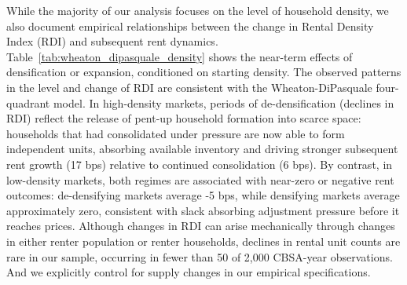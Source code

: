 \documentclass[pdflatex,sn-apa]{sn-jnl}%
\theoremstyle{thmstyleone}%
\theoremstyle{thmstyletwo}%
\theoremstyle{thmstylethree}%
\begin{document}
While the majority of our analysis focuses on the level of household density, we also document empirical relationships between the change in Rental Density Index (RDI) and subsequent rent dynamics. Table~\ref{tab:wheaton_dipasquale_density} shows the near-term effects of densification or expansion, conditioned on starting density. The observed patterns in the level and change of RDI are consistent with the Wheaton-DiPasquale four-quadrant model. In high-density markets, periods of de-densification (declines in RDI) reflect the release of pent-up household formation into scarce space: households that had consolidated under pressure are now able to form independent units, absorbing available inventory and driving stronger subsequent rent growth (17 bps) relative to continued consolidation (6 bps). By contrast, in low-density markets, both regimes are associated with near-zero or negative rent outcomes: de-densifying markets average -5 bps, while densifying markets average approximately zero, consistent with slack absorbing adjustment pressure before it reaches prices. Although changes in RDI can arise mechanically through changes in either renter population or renter households, declines in rental unit counts are rare in our sample, occurring in fewer than 50 of 2,000 CBSA-year observations. And we explicitly control for supply changes in our empirical specifications.
\end{document}
